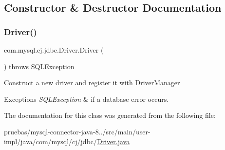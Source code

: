 \subsection{Constructor \& Destructor Documentation}
\mbox{\label{classcom_1_1mysql_1_1cj_1_1jdbc_1_1_driver_aa4ef6be75ad3caf8eb7ebd1cfe77ddfe}} 
\subsubsection{\texorpdfstring{Driver()}{Driver()}}
{\footnotesize\ttfamily com.\+mysql.\+cj.\+jdbc.\+Driver.\+Driver (\begin{DoxyParamCaption}{ }\end{DoxyParamCaption}) throws S\+Q\+L\+Exception}

Construct a new driver and register it with Driver\+Manager


\begin{DoxyExceptions}{Exceptions}
{\em S\+Q\+L\+Exception} & if a database error occurs. \\
\hline
\end{DoxyExceptions}


The documentation for this class was generated from the following file\+:\begin{DoxyCompactItemize}
\item 
pruebas/mysql-\/connector-\/java-\/8../src/main/user-\/impl/java/com/mysql/cj/jdbc/\mbox{\hyperlink{main_2user-impl_2java_2com_2mysql_2cj_2jdbc_2_driver_8java}{Driver.\+java}}\end{DoxyCompactItemize}
